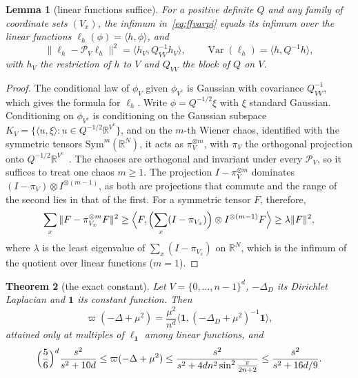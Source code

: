 \documentclass[11pt]{amsart}
\newtheorem{theorem}{Theorem}[section]
\newtheorem{lemma}[theorem]{Lemma}
\theoremstyle{definition}
\theoremstyle{remark}
\numberwithin{equation}{section}
\newcommand{\R}{\mathbb{R}}
\newcommand{\Var}{\operatorname{Var}}
\newcommand{\ip}[2]{\langle #1,#2\rangle}
\begin{document}
\begin{lemma}[linear functions suffice]\label{lem:chaos}
For a positive definite $Q$ and any family of coordinate sets $(V_x)$, the
infimum in~\eqref{eq:ffvarpi} equals its infimum over the linear functions
$\ell_h(\phi)=\ip h\phi$, and
\[
\|\ell_h-\mathcal P_V\ell_h\|^2=\ip{h_V}{Q_{VV}^{-1}h_V},\qquad
\Var(\ell_h)=\ip h{Q^{-1}h},
\]
with $h_V$ the restriction of $h$ to $V$ and $Q_{VV}$ the block of $Q$ on $V$.
\end{lemma}

\begin{proof}
The conditional law of $\phi_V$ given $\phi_{V^c}$ is Gaussian with covariance
$Q_{VV}^{-1}$, which gives the formula for $\ell_h$. Write $\phi=Q^{-1/2}\xi$ with
$\xi$ standard Gaussian. Conditioning on $\phi_{V^c}$ is conditioning on the
Gaussian subspace $K_V=\{\ip u\xi:u\in Q^{-1/2}\R^{V^c}\}$, and on the $m$-th
Wiener chaos, identified with the symmetric tensors $\mathrm{Sym}^m(\R^N)$, it
acts as $\pi_V^{\otimes m}$, with $\pi_V$ the orthogonal projection onto $Q^{-1/2}
\R^{V^c}$~\cite[Ch.~4]{Jan97}. The chaoses are orthogonal and invariant under
every $\mathcal P_V$, so it suffices to treat one chaos $m\ge1$. The projection
$I-\pi_V^{\otimes m}$ dominates $(I-\pi_V)\otimes I^{\otimes(m-1)}$, as both are
projections that commute and the range of the second lies in that of the
first. For a symmetric tensor $F$, therefore,
\[
\sum_x\|F-\pi_{V_x}^{\otimes m}F\|^2\ge\Bigl\langle F,\Bigl(\sum_x(I-\pi_{V_x})\Bigr)
\otimes I^{\otimes(m-1)}F\Bigr\rangle\ge\lambda\|F\|^2,
\]
where $\lambda$ is the least eigenvalue of $\sum_x(I-\pi_{V_x})$ on $\R^N$, which is
the infimum of the quotient over linear functions ($m=1$).
\end{proof}

\begin{theorem}[the exact constant]\label{thm:free}
Let $V=\{0,\dots,n-1\}^d$, $-\Delta_D$ its Dirichlet Laplacian and $\mathbf 1$ its
constant function. Then
\[
\varpi(-\Delta+\mu^2)=\frac{\mu^2}{n^d}\ip{\mathbf 1}{(-\Delta_D+\mu^2)^{-1}\mathbf 1},
\]
attained only at multiples of $\ell_{\mathbf 1}$ among linear functions, and
\[
\Bigl(\frac56\Bigr)^d\frac{s^2}{s^2+10d}\le\varpi(-\Delta+\mu^2)\le\frac{s^2}
{s^2+4dn^2\sin^2\frac\pi{2n+2}}\le\frac{s^2}{s^2+16d/9}.
\]
\end{theorem}
\end{document}
